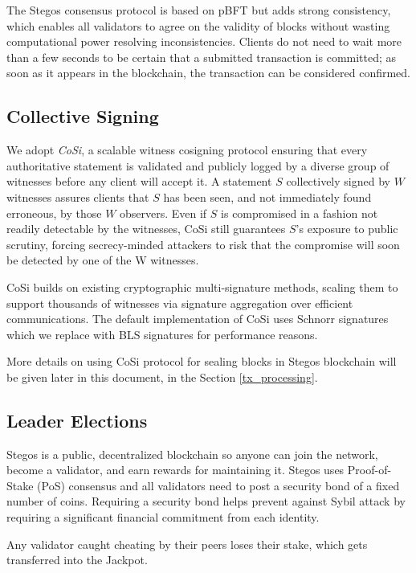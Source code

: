 \documentclass[a4paper, 10pt, conference]{ieeeconf}
\begin{document}
The Stegos consensus protocol is based on pBFT\cite{c9} but adds strong consistency, which enables all validators to agree on the validity of blocks without wasting computational power resolving inconsistencies. Clients do not need to wait more than a few seconds to be certain that a submitted transaction is committed; as soon as it appears in the blockchain, the transaction can be considered confirmed. 

\subsection{Collective Signing}

We adopt \textit{CoSi}\cite{c10}\cite{c11}, a scalable witness cosigning protocol ensuring that every authoritative statement is validated and publicly logged by a diverse group of witnesses before any client will accept it. A statement $S$ collectively signed by $W$ witnesses assures clients that $S$ has been seen, and not immediately found erroneous, by those $W$ observers. Even if $S$ is compromised in a fashion not readily detectable by the witnesses, CoSi still guarantees $S$’s exposure to public scrutiny, forcing secrecy-minded attackers to risk that the compromise will soon be detected by one of the W witnesses. 

CoSi builds on existing cryptographic multi-signature methods, scaling them to support thousands of witnesses via signature aggregation over efficient communications. The default implementation of CoSi uses Schnorr signatures which we replace with BLS signatures for performance reasons.

More details on using CoSi protocol for sealing blocks in Stegos blockchain will be given later in this document, in the Section \ref{tx_processing}.


\subsection{Leader Elections}

Stegos is a public, decentralized blockchain so anyone can join the network, become a validator, and earn rewards for maintaining it. Stegos uses Proof-of-Stake (PoS) consensus and all validators need to post a security bond of a fixed number of coins. Requiring a security bond helps prevent against Sybil attack by requiring a significant financial commitment from each identity.

Any validator caught cheating by their peers loses their stake, which gets transferred into the Jackpot. 
\end{document}
